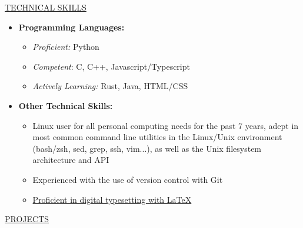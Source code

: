 \documentclass[11pt]{article}
\newcommand{\betteruline}[1]{
    \uline{#1}
}
\newcommand{\sectiontitle}[1]{
    \begingroup
        \titlebold
        \betteruline{\Large\uppercase{#1}  }
        \vspace{1.7mm}
    \endgroup
}
\newcommand{\sectioncontent}[1]{
    \begingroup
        \begin{FlushLeft}
        \vspace{-3mm}
        \sffamily\small#1
        \end{FlushLeft}
    \endgroup
    \vspace{2mm}
}
\begin{document}
    \sectiontitle{Technical Skills}
    \sectioncontent{
      \begin{itemize}
        \item \textbf{Programming Languages: }
          \begin{itemize}
            \item \textit{Proficient:} Python 
            \item \textit{Competent}: C, C++, Javascript/Typescript
            \item \textit{Actively Learning:} Rust, Java, HTML/CSS
          \end{itemize}

        \item \textbf{Other Technical Skills:}
          \begin{itemize}
            \item  Linux user for all personal computing needs for the past 7 years, adept in most common command line utilities in the Linux/Unix environment (bash/zsh, sed, grep, ssh, vim...), as well as the Unix filesystem architecture and API
            \item Experienced with the use of version control with Git
            \item \href{https://github.com/keagud/resume}{Proficient in digital typesetting with \LaTeX}
          \end{itemize}
      \end{itemize}
    }
    \sectiontitle{projects}
\end{document}
